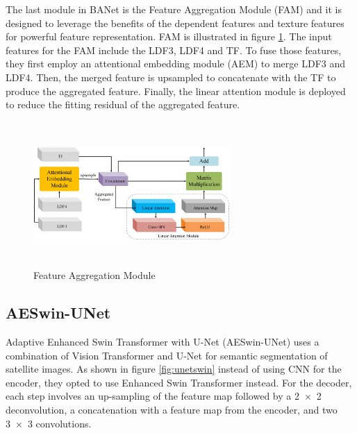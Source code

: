 The last module in BANet is the Feature Aggregation Module (FAM) and it is designed to leverage the benefits of the dependent features and texture features for powerful feature representation. FAM is illustrated in figure \ref{fig:fam}. The input features for the FAM include the LDF3, LDF4 and TF. To fuse those features, they first employ an attentional embedding module (AEM) to merge LDF3 and LDF4. Then, the merged feature is upsampled to concatenate with the TF to produce the aggregated feature. Finally, the linear attention module is deployed to reduce the fitting residual of the aggregated feature.

\FloatBarrier
\begin{figure}[ht]
\includegraphics[width=7.5cm, height=5.5cm]{images/fam.jpg}
\centering
\caption{Feature Aggregation Module \protect\cite{banet}}
\label{fig:fam}
\end{figure}

\subsection{AESwin-UNet}
Adaptive Enhanced Swin Transformer with U-Net (AESwin-UNet) \cite{unet-transformer}  uses a combination of Vision Transformer and U-Net for semantic segmentation of satellite images. As shown in figure \ref{fig:unetswin} instead of using CNN for the encoder, they opted to use Enhanced Swin Transformer instead.  For the decoder, each step involves an up-sampling of the feature map followed by a 2 × 2 deconvolution, a concatenation with a feature map from the encoder, and two 3 × 3 convolutions. 

